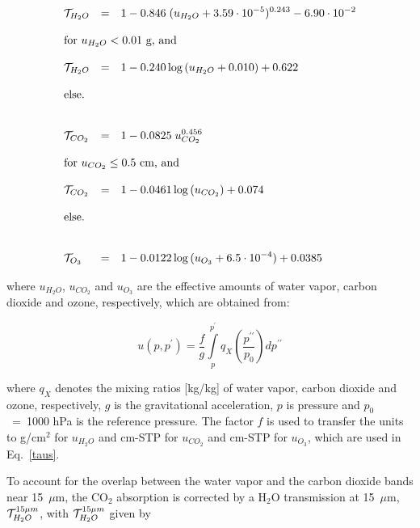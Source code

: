 \begin{equation}\label{taus}
\begin{array}{lcl}
\D {\cal T}_{H_2O}& = & \D 1-0.846\;(u_{H_2O}+3.59 \cdot 10^{-5})^{0.243}
-6.90\cdot 10^{-2} \\
&& \\
\multicolumn{3}{l}{\mbox{for } u_{H_2O} < 0.01\mbox{ g, and }}\\
&& \\
\D {\cal T}_{H_2O}& = & \D 1-0.240\log{(u_{H_2O}+0.010)}+0.622 \\
&& \\
\multicolumn{3}{l}{\mbox{else.}}\\
&&\\
&&\\
\D {\cal T}_{CO_2}& = & \D 1-0.0825\;u_{CO_2}^{0.456}\\
&& \\
\multicolumn{3}{l}{\mbox{for } u_{CO_2} \le 0.5 \mbox{ cm, and }}\\
&& \\
\D {\cal T}_{CO_2}& = & \D 1-0.0461\log{(u_{CO_2})}+0.074 \\
&& \\
\multicolumn{3}{l}{\mbox{else.}}\\
&&\\
&&\\
\D {\cal T}_{O_3} & = & \D 1-0.0122\log{(u_{O_3}+6.5 \cdot 10^{-4})}+0.0385 
\end{array}
\end{equation}

where $u_{H_2O}$, $u_{CO_2}$ and $u_{O_3}$ are the effective
amounts of water vapor, carbon
dioxide and ozone, respectively, which are obtained from:

\begin{equation}
u(p, p^{\prime}) =  
\frac{f}{g}
\int\limits_{p}^{p^{\prime}} q_X
\left(\frac{p^{\prime\prime}}{p_0}\right)
dp^{\prime\prime} 
\end{equation}

where $q_X$ denotes the mixing
ratios [kg/kg] of water vapor, carbon dioxide and ozone,
respectively, $g$ is the gravitational acceleration, $p$
is pressure and $p_0$~=~1000 hPa is the reference
pressure. The factor $f$ is used to transfer the units to g/cm$^2$
for $u_{H_2O}$ and cm-STP for
$u_{CO_2}$ and cm-STP for $u_{O_3}$, which are used in Eq.~\ref{taus}.

To account for the overlap between
the water vapor and the carbon dioxide bands near
15~$\mu$m, the CO$_2$ absorption is
corrected by a H$_2$O transmission at 15~$\mu$m,
${\cal T}_{H_2O}^{15\mu m}$, with
${\cal T}_{H_2O}^{15\mu
m}$ given  by 

